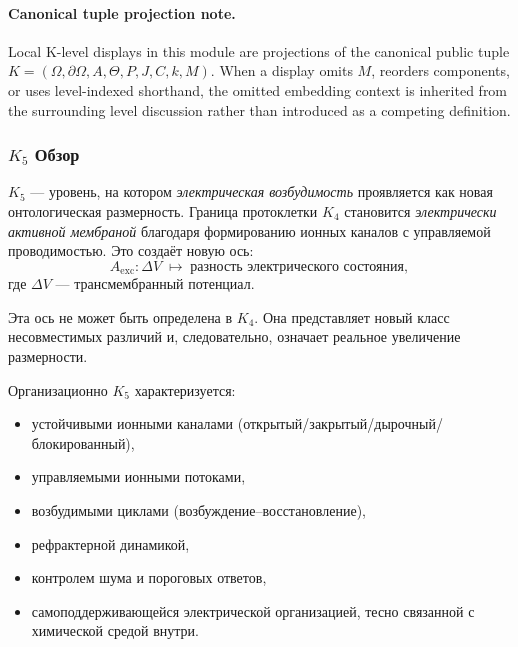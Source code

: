 



\paragraph{Canonical tuple projection note.}
Local K-level displays in this module are projections of the canonical public tuple \(K=(\Omega,\partial\Omega,A,\Theta,P,J,C,k,M)\). When a display omits \(M\), reorders components, or uses level-indexed shorthand, the omitted embedding context is inherited from the surrounding level discussion rather than introduced as a competing definition.

\subsubsection{\texorpdfstring{$K_5$}{K_5} Обзор}
\label{sec:k5-overview}

$K_5$ — уровень, на котором \emph{электрическая возбудимость} проявляется
как новая онтологическая размерность. Граница протоклетки $K_4$ становится
\emph{электрически активной мембраной} благодаря формированию ионных
каналов с управляемой проводимостью. Это создаёт новую ось:
\[
A_{\mathrm{exc}}: \Delta V \;\mapsto\; \text{разность электрического состояния},
\]
где $\Delta V$ — трансмембранный потенциал.

Эта ось не может быть определена в $K_4$. Она представляет новый класс
несовместимых различий и, следовательно, означает реальное увеличение
размерности.

Организационно $K_5$ характеризуется:
\begin{itemize}
    \item устойчивыми ионными каналами (открытый/закрытый/дырочный/блокированный),
    \item управляемыми ионными потоками,
    \item возбудимыми циклами (возбуждение–восстановление),
    \item рефрактерной динамикой,
    \item контролем шума и пороговых ответов,
    \item самоподдерживающейся электрической организацией, тесно
          связанной с химической средой внутри.
\end{itemize}


